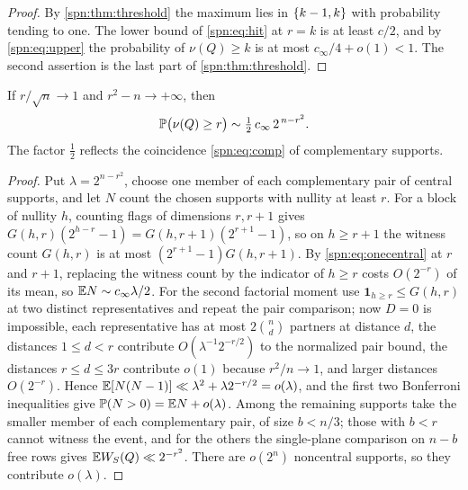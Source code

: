 \begin{proof}
By \cref{spn:thm:threshold} the maximum lies in $\{k-1,k\}$ with probability tending to one.
The lower bound of \eqref{spn:eq:hit} at $r=k$ is at least $c/2$, and by \eqref{spn:eq:upper}
the probability of $\nu(Q)\ge k$ is at most $c_\infty/4+o(1)<1$. The second assertion is the
last part of \cref{spn:thm:threshold}.
\end{proof}

\begin{proposition}\label{spn:prop:raretail}
If $r/\sqrt n\to1$ and $r^2-n\to+\infty$, then
\[
 \mathbb{P}\bigl(\nu(Q)\ge r\bigr)\sim\tfrac12\,c_\infty\,2^{\,n-r^2}.
\]
The factor $\tfrac12$ reflects the coincidence \eqref{spn:eq:comp} of complementary supports.
\end{proposition}

\begin{proof}
Put $\lambda=2^{n-r^2}$, choose one member of each complementary pair of central supports,
and let $N$ count the chosen supports with nullity at least $r$. For a block of nullity $h$,
counting flags of dimensions $r,r+1$ gives $G(h,r)(2^{h-r}-1)=G(h,r+1)(2^{r+1}-1)$, so on
$h\ge r+1$ the witness count $G(h,r)$ is at most $(2^{r+1}-1)G(h,r+1)$. By
\eqref{spn:eq:onecentral} at $r$ and $r+1$, replacing the witness count by the indicator of
$h\ge r$ costs $O(2^{-r})$ of its mean, so $\mathbb{E} N\sim c_\infty\lambda/2$. For the second
factorial moment use $\mathbf 1_{h\ge r}\le G(h,r)$ at two distinct representatives and repeat
the pair comparison; now $D=0$ is impossible, each representative has at most $2\binom nd$
partners at distance $d$, the distances $1\le d<r$ contribute $O(\lambda^{-1}2^{-r/2})$ to the
normalized pair bound, the distances $r\le d\le3r$ contribute $o(1)$ because $r^2/n\to1$, and
larger distances $O(2^{-r})$. Hence $\mathbb{E}[N(N-1)]\ll\lambda^2+\lambda2^{-r/2}=o(\lambda)$, and
the first two Bonferroni inequalities give $\mathbb{P}(N>0)=\mathbb{E} N+o(\lambda)$. Among the remaining
supports take the smaller member of each complementary pair, of size $b<n/3$; those with
$b<r$ cannot witness the event, and for the others the single-plane comparison on $n-b$ free
rows gives $\mathbb{E} W_S(Q)\ll2^{-r^2}$. There are $o(2^n)$ noncentral supports, so they
contribute $o(\lambda)$.
\end{proof}

